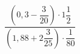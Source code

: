 \begin{ex}[type=calculate]
	\begin{condition}
		\( \dfrac{\left( 0,3-\dfrac{3}{20} \right)\cdot1\dfrac{1}{2}}{\left( 1,88+2\dfrac{3}{25} \right)\cdot\dfrac{1}{80}} \)
	\end{condition}
\end{ex}